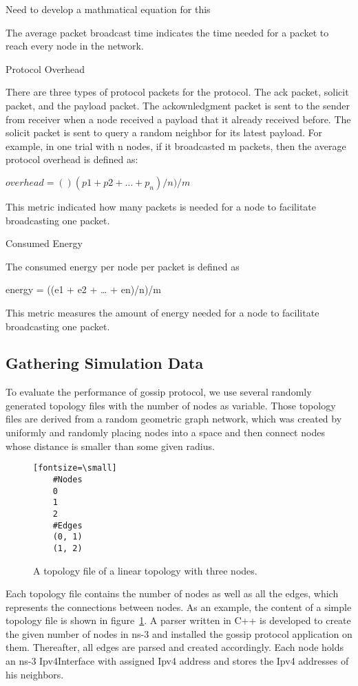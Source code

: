 Need to develop a mathmatical equation for this

The average packet broadcast time indicates the time needed for a packet to reach every node in the network.

Protocol Overhead

There are three types of protocol packets for the protocol. The ack packet, solicit packet, and the payload packet. The ackownledgment packet is sent to the sender from receiver when a node received a payload that it already received before. The solicit packet is sent to query a random neighbor for its latest payload. For example, in one trial with n nodes, if it broadcasted m packets, then the average protocol overhead is defined as:

$overhead = ()(p1 + p2 + … + p_n) / n) / m$

This metric indicated how many packets is needed for a node to facilitate broadcasting one packet. 

Consumed Energy

The consumed energy per node per packet is defined as

energy = ((e1 + e2 + … + en)/n)/m

This metric measures the amount of energy needed for a node to facilitate broadcasting one packet. 


\subsection{Gathering Simulation Data}

To evaluate the performance of gossip protocol, we use several randomly generated topology files with the number of nodes as variable. Those topology files are derived from a random geometric graph network, which was created by uniformly and randomly placing nodes into a space and then connect nodes whose distance is smaller than some given radius.

\begin{figure}
	\centering
	\begin{verbatim}[fontsize=\small]
	#Nodes
	0
	1
	2
	#Edges
	(0, 1)
	(1, 2)
	\end{verbatim}
	\caption{A topology file of a linear topology with three nodes.}
	\label{fig:topsimple}
\end{figure}


Each topology file contains the number of nodes as well as all the edges, which represents the connections between nodes. As an example, the content of a simple topology file is shown in figure~\ref{fig:topsimple}. A parser written in C++ is developed to create the given number of nodes in ns-3 and installed the gossip protocol application on them. Thereafter, all edges are parsed and created accordingly. Each node holds an ns-3 Ipv4Interface with assigned Ipv4 address and stores the Ipv4 addresses of his neighbors.

